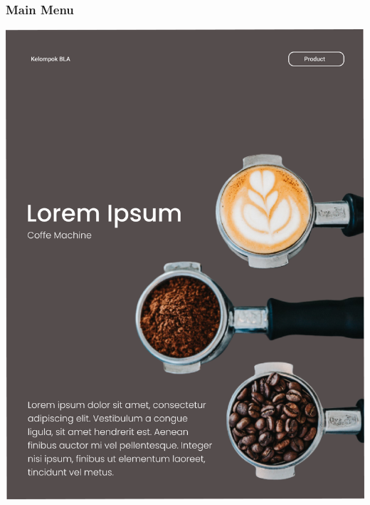 \documentclass[12pt]{article}
\begin{document}
\subsubsection{Main Menu}
\includegraphics[width=1\linewidth]{./img/mainMenu.png}
\end{document}
